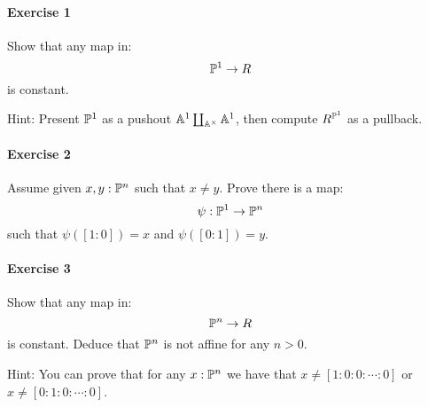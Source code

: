 \paragraph{Exercise 1}{
Show that any map in: 
\[\mathbb{P}^1 \to R\]
is constant.
}

Hint: Present $\mathbb{P}^1$ as a pushout $\mathbb{A}^1\coprod_{\mathbb{A}^\times}\mathbb{A}^1$, then compute $R^{\mathbb{P}^1}$ as a pullback.

\paragraph{Exercise 2}{
Assume given $x,y:\mathbb{P}^n$ such that $x\not=y$. Prove there is a map:
\[\psi: \mathbb{P}^1 \to \mathbb{P}^n\]
such that $\psi([1:0]) = x$ and $\psi([0:1]) = y$.
}

\paragraph{Exercise 3}{
Show that any map in: 
\[\mathbb{P}^n \to R\]
is constant. Deduce that $\mathbb{P}^n$ is not affine for any $n>0$.
}

Hint: You can prove that for any $x:\mathbb{P}^n$ we have that $x\not=[1:0:0:\cdots:0]$ or $x\not=[0:1:0:\cdots:0]$.